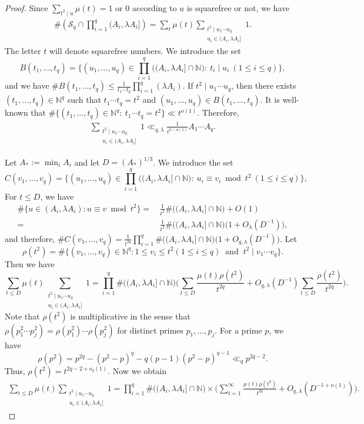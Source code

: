 \documentclass[12pt,a4paper,reqno]{amsart}
\numberwithin{equation}{section}
\newcommand{\N}{\mathbb N}
\newcommand{\1}{\mathbf 1}
\theoremstyle{plain}
\theoremstyle{definition}
\begin{document}
\begin{proof} Since $\sum_{t^2\mid u}\mu(t)=1$ or $0$ according to $u$ is squarefree or not, we have
\begin{align}\label{bound0}\#\left(
 \mathcal S_q\cap\prod_{i=1}^q(A_i,\lambda A_i]
 \right)=\sum_{t}\mu(t)\sum_{\substack{t^2\mid u_1\cdots u_q \\ u_i\in (A_i,\lambda A_i]}}1.\end{align}
The letter $t$ will denote squarefree numbers. We introduce the set 
$$B(t_1,\ldots,t_q)=\{(u_1,\ldots,u_q)\in \prod_{i=1}^q\bigl((A_i,\lambda A_i]\cap\N\bigr):\ t_i\mid u_i ~(1\leq i\leq q)\},$$
 and we have
$\# B(t_1,\ldots,t_q) \leq \frac{1}{t_1\cdots t_q}\prod_{i=1}^q(\lambda A_i)$. 
If $t^2\mid u_1\cdots u_q$, then there exists $(t_1,\ldots,t_q)\in \N^q$ such that $t_1\cdots t_q=t^2$ and $(u_1,\ldots,u_q)\in B(t_1,\ldots,t_q)$. It is well-known that $\#\{(t_1,\ldots,t_q)\in \N^q:\ t_1\cdots t_q=t^2\}\ll t^{o(1)}$. Therefore, 
\begin{align}\label{bound1}\sum_{\substack{t^2\mid u_1\cdots u_q \\ u_i\in (A_i,\lambda A_i]}}1\ll_{q,\lambda} \frac{1}{t^{2-o(1)}}A_1\cdots A_q.\end{align}

Let $A_*:=\min_iA_i$ and let $D=(A_\ast)^{1/3}$. We introduce the set 
$$C(v_1,\ldots,v_q)=\{(u_1,\ldots,u_q)\in \prod_{i=1}^q\bigl((A_i,\lambda A_i]\cap\N\bigr):\ u_i\equiv v_i\bmod {t^2} ~(1\leq i\leq q)\},$$
For $t\leq D$, we have 
\begin{align*}\#\{u\in (A_i,\lambda A_i): u\equiv v\bmod {t^2}\}=&\, \frac{1}{t^2}\#\bigl((A_i,\lambda A_i]\cap\N\bigr)+O(1)
\\ =&\,\frac{1}{t^2}\#\bigl((A_i,\lambda A_i]\cap\N\bigr)\big(1+O_{\lambda}(D^{-1})\big),\end{align*}
and therefore,
$\# C(v_1,\ldots,v_q) =\frac{1}{t^{2q}} \prod_{i=1}^q\#\bigl((A_i,\lambda A_i]\cap\N\bigr)\big(1+O_{q,\lambda}(D^{-1})\big)$. 
Let 
$$\rho(t^2)=\#\{(v_1,\ldots,v_q)\in \N^q: 1\leq v_i\leq t^2(1\leq i\leq q)\ \textrm{ and }\ t^2\mid v_1\cdots v_q\}.$$
Then we have 
$$\sum_{t\leq D}\mu(t)\sum_{\substack{t^2\mid u_1\cdots u_q \\ u_i\in (A_i,\lambda A_i]}}1=\prod_{i=1}^q\#\bigl((A_i,\lambda A_i]\cap\N\bigr)\Big(\sum_{t\leq D}\frac{\mu(t)\rho(t^2)}{t^{2q}}+O_{q,\lambda}(D^{-1})\sum_{t\leq D}\frac{\rho(t^2)}{t^{2q}}\Big).$$
Note that $\rho(t^2)$ is multiplicative in the sense that $\rho(p_1^2\cdots p_j^2)=\rho(p_1^2)\cdots \rho(p_j^2)$ for distinct primes $p_1,\ldots,p_j$. 
For a prime $p$, we have 
$$\rho(p^2)=p^{2q}-(p^2-p)^q-q(p-1)(p^2-p)^{q-1}\ll_{q}p^{2q-2}.$$
Thus, $\rho(t^2)=t^{2q-2+o_{q}(1)}$. Now we obtain
\begin{align}\label{bound2}\sum_{t\leq D}\mu(t)\sum_{\substack{t^2\mid u_1\cdots u_q \\ u_i\in (A_i,\lambda A_i]}}1=\prod_{i=1}^q\#\bigl((A_i,\lambda A_i]\cap\N\bigr)
\times\Big(\sum_{t=1}^\infty\frac{\mu(t)\rho(t^2)}{t^{2q}}+O_{q,\lambda}(D^{-1+o(1)})\Big).\end{align}


\end{proof}
\end{document}
